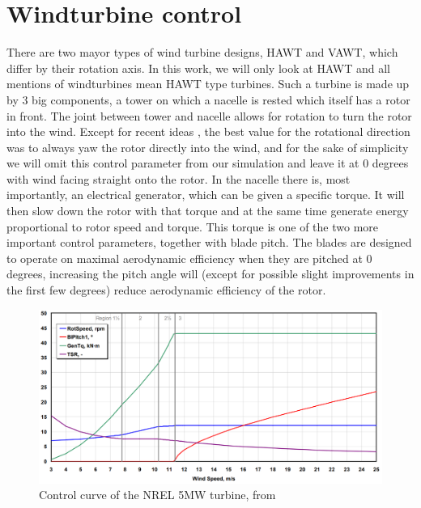 \documentclass[hyperref,german,beleg]{cgvpub}
\begin{document}
\section{Windturbine control}
There are two mayor types of wind turbine designs, \ac{HAWT} and \ac{VAWT}, which differ by their rotation axis. In this work, we will only look at \ac{HAWT} and all mentions of windturbines mean \ac{HAWT} type turbines. Such a turbine is made up by 3 big components, a tower on which a nacelle is rested which itself has a rotor in front. 
The joint between tower and nacelle allows for rotation to turn the rotor into the wind. Except for recent ideas \cite{howlandWindFarmPower2019}, the best value for the rotational direction was to always yaw the rotor directly into the wind, and for the sake of simplicity we will omit this control parameter from our simulation and leave it at 0 degrees with wind facing straight onto the rotor.
In the nacelle there is, most importantly, an electrical generator, which can be given a specific torque. It will then slow down the rotor with that torque and at the same time generate energy proportional to rotor speed and torque. This torque is one of the two more important control parameters, together with blade pitch. The blades are designed to operate on maximal aerodynamic efficiency when they are pitched at 0 degrees, increasing the pitch angle will (except for possible slight improvements in the first few degrees) reduce aerodynamic efficiency of the rotor.

\begin{figure}
  \centering
  \includegraphics{NREL-5MW.png}
  \caption{Control curve of the NREL 5MW turbine, from \cite{jonkmanDefinition5MWReference2009}}
  \label{fig:nrel5mw}
\end{figure}
\end{document}

